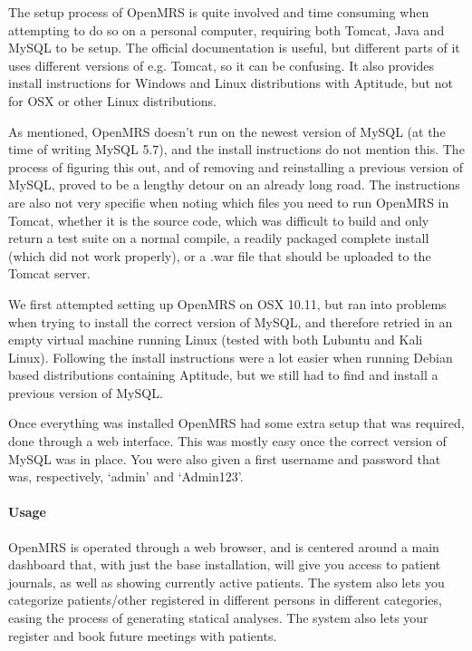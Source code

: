 \documentclass{article}
\begin{document}
  The setup process of OpenMRS is quite involved and time consuming when
  attempting to do so on a personal computer, requiring both Tomcat, Java and
  MySQL to be setup. The official documentation is useful, but different parts
  of it uses different versions of e.g. Tomcat, so it can be confusing.
  It also provides install instructions for Windows and Linux distributions
  with Aptitude, but not for OSX or other Linux distributions. 

  As mentioned, OpenMRS doesn't run on the newest version of MySQL (at the time
  of writing MySQL 5.7), and the install instructions do not mention this. The
  process of figuring this out, and of removing and reinstalling a previous
  version of MySQL, proved to be a lengthy detour on an already long road.
  The instructions are also not very specific when noting which files you need
  to run OpenMRS in Tomcat, whether it is the source code, which was difficult
  to build and only return a test suite on a normal compile, a readily packaged
  complete install (which did not work properly), or a .war file that should be
  uploaded to the Tomcat server.

  We first attempted setting up OpenMRS on OSX 10.11, but ran into problems when
  trying to install the correct version of MySQL, and therefore retried in an
  empty virtual machine running Linux (tested with both Lubuntu and Kali Linux).
  Following the install instructions were a lot easier when running Debian based
  distributions containing Aptitude, but we still had to find and install a
  previous version of MySQL. 

  Once everything was installed OpenMRS had some extra setup that was required,
  done through a web interface. This was mostly easy once the correct version of
  MySQL was in place. You were also given a first username and password that
  was, respectively, `admin' and `Admin123'.

  \paragraph{Usage}

  OpenMRS is operated through a web browser, and is centered around a main dashboard that,
  with just the base installation, will give you access to patient journals, as well as
  showing currently active patients. The system also lets you categorize patients/other registered
  in different persons in different categories, easing the process of generating statical analyses.
  The system also lets your register and book future meetings with patients.
\end{document}
